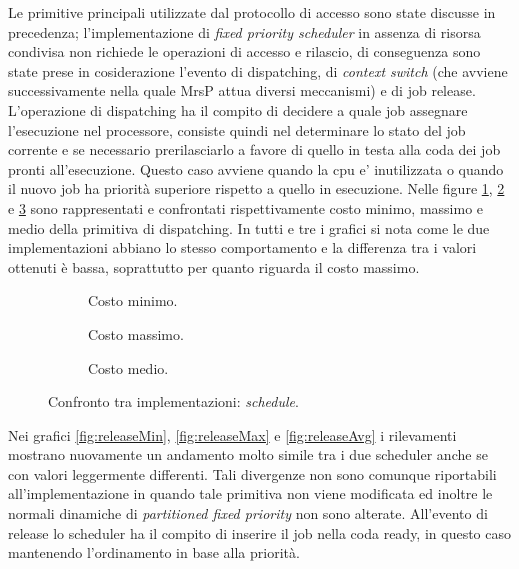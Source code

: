 \noindent Le primitive principali utilizzate dal protocollo di accesso sono state discusse in precedenza; l'implementazione di \textit{fixed priority scheduler} in assenza di risorsa condivisa non richiede le operazioni di accesso e rilascio, di conseguenza sono state prese in cosiderazione l'evento di dispatching, di \textit{context switch} (che avviene successivamente nella quale MrsP attua diversi meccanismi) e di job release.\\

\noindent L'operazione di dispatching ha il compito di decidere a quale job assegnare l'esecuzione nel processore, consiste quindi nel determinare lo stato del job corrente e se necessario prerilasciarlo a favore di quello in testa alla coda dei job pronti all'esecuzione. Questo caso avviene quando la cpu e' inutilizzata o quando il nuovo job ha priorità superiore rispetto a quello in esecuzione. Nelle figure \ref{fig:schedMin}, \ref{fig:schedMax} e \ref{fig:schedAvg} sono rappresentati e confrontati rispettivamente costo minimo, massimo e medio della primitiva di dispatching. In tutti e tre i grafici si nota come le due implementazioni abbiano lo stesso comportamento e la differenza tra i valori ottenuti è bassa, soprattutto per quanto riguarda il costo massimo.\\

  \begin{figure}[htb]
    \centering
      \begin{subfigure}[b]{0.49\textwidth}
        \centering
        \resizebox{\linewidth}{!}\graficoSchedMIN  
        \caption{Costo minimo.}
        \label{fig:schedMin}
      \end{subfigure}
      \begin{subfigure}[b]{0.49\textwidth}
        \centering
        \resizebox{\linewidth}{!}\graficoSchedMAX
        \caption{Costo massimo.}
        \label{fig:schedMax}
      \end{subfigure}
      \begin{subfigure}[b]{0.49\textwidth}
        \centering
        \resizebox{\linewidth}{!}\graficoSchedAVG
        \caption{Costo medio.}
        \label{fig:schedAvg}
      \end{subfigure}

    \caption{Confronto tra implementazioni: \textit{schedule}.}
    \label{fig:sched}
  \end{figure}

\noindent Nei grafici \ref{fig:releaseMin}, \ref{fig:releaseMax} e \ref{fig:releaseAvg} i rilevamenti mostrano nuovamente un andamento molto simile tra i due scheduler anche se con valori leggermente differenti. Tali divergenze non sono comunque riportabili all'implementazione in quando tale primitiva non viene modificata ed inoltre le normali dinamiche di \textit{partitioned fixed priority} non sono alterate. All'evento di release lo scheduler ha il compito di inserire il job nella coda ready, in questo caso mantenendo l'ordinamento in base alla priorità.\\

